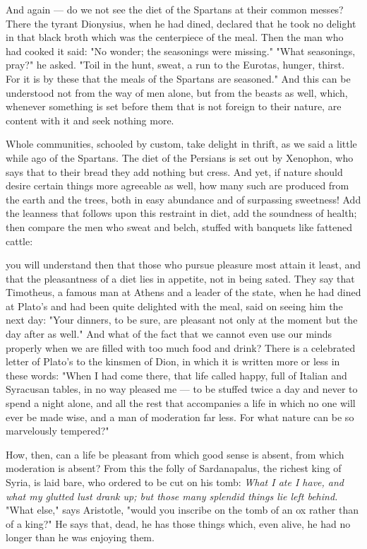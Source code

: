  And again — do we not see the diet of the Spartans at their common messes? There the tyrant Dionysius, when he had dined, declared that he took no delight in that black broth which was the centerpiece of the meal. Then the man who had cooked it said: "No wonder; the seasonings were missing." "What seasonings, pray?" he asked. "Toil in the hunt, sweat, a run to the Eurotas, hunger, thirst. For it is by these that the meals of the Spartans are seasoned." And this can be understood not from the way of men alone, but from the beasts as well, which, whenever something is set before them that is not foreign to their nature, are content with it and seek nothing more.

 Whole communities, schooled by custom, take delight in thrift, as we said a little while ago of the Spartans. The diet of the Persians is set out by Xenophon, who says that to their bread they add nothing but cress. And yet, if nature should desire certain things more agreeable as well, how many such are produced from the earth and the trees, both in easy abundance and of surpassing sweetness! Add the leanness that follows upon this restraint in diet, add the soundness of health; then compare the men who sweat and belch, stuffed with banquets like fattened cattle:

 you will understand then that those who pursue pleasure most attain it least, and that the pleasantness of a diet lies in appetite, not in being sated. They say that Timotheus, a famous man at Athens and a leader of the state, when he had dined at Plato's and had been quite delighted with the meal, said on seeing him the next day: "Your dinners, to be sure, are pleasant not only at the moment but the day after as well." And what of the fact that we cannot even use our minds properly when we are filled with too much food and drink? There is a celebrated letter of Plato's to the kinsmen of Dion, in which it is written more or less in these words: "When I had come there, that life called happy, full of Italian and Syracusan tables, in no way pleased me — to be stuffed twice a day and never to spend a night alone, and all the rest that accompanies a life in which no one will ever be made wise, and a man of moderation far less. For what nature can be so marvelously tempered?"

 How, then, can a life be pleasant from which good sense is absent, from which moderation is absent? From this the folly of Sardanapalus, the richest king of Syria, is laid bare, who ordered to be cut on his tomb: \textit{What I ate I have, and what my glutted lust drank up; but those many splendid things lie left behind.} "What else," says Aristotle, "would you inscribe on the tomb of an ox rather than of a king?" He says that, dead, he has those things which, even alive, he had no longer than he was enjoying them.

